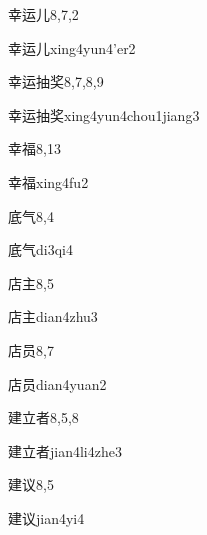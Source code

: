 \begin{entry}{幸运儿}{8,7,2}
  \begin{phonetics}{幸运儿}{xing4yun4'er2}
  \end{phonetics}
\end{entry}

\begin{entry}{幸运抽奖}{8,7,8,9}
  \begin{phonetics}{幸运抽奖}{xing4yun4chou1jiang3}
  \end{phonetics}
\end{entry}

\begin{entry}{幸福}{8,13}
  \begin{phonetics}{幸福}{xing4fu2}
  \end{phonetics}
\end{entry}

\begin{entry}{底气}{8,4}
  \begin{phonetics}{底气}{di3qi4}
  \end{phonetics}
\end{entry}

\begin{entry}{店主}{8,5}
  \begin{phonetics}{店主}{dian4zhu3}
  \end{phonetics}
\end{entry}

\begin{entry}{店员}{8,7}
  \begin{phonetics}{店员}{dian4yuan2}
  \end{phonetics}
\end{entry}

\begin{entry}{建立者}{8,5,8}
  \begin{phonetics}{建立者}{jian4li4zhe3}
  \end{phonetics}
\end{entry}

\begin{entry}{建议}{8,5}
  \begin{phonetics}{建议}{jian4yi4}
  \end{phonetics}
\end{entry}

